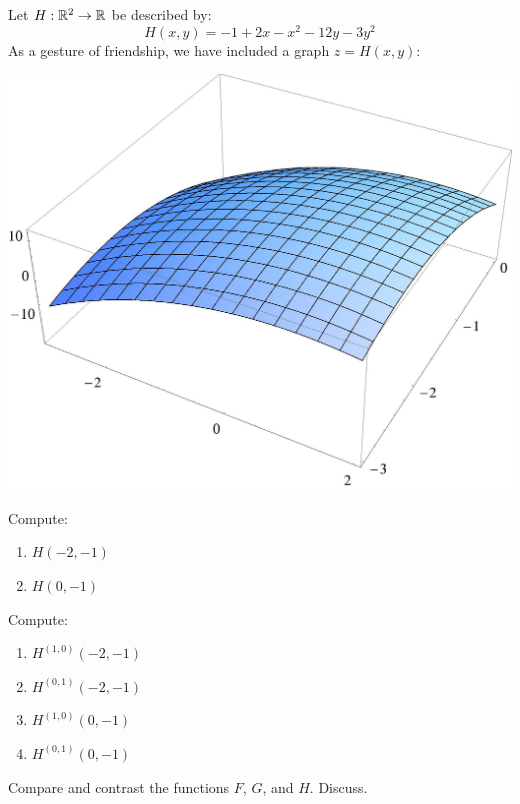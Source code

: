 \documentclass[handout,noauthor,nooutcomes]{ximera}
\begin{document}
Let  $H:\mathbb R^2\to\mathbb R$ be described by:
\[
H(x,y) = -1 + 2 x - x^2 - 12 y - 3 y^2
\]
As a gesture of friendship, we have included a graph $z = H(x,y)$:
\begin{image}
  \includegraphics{surfacePlot.jpg}
\end{image}

\begin{problem}
  Compute:
    \begin{multicols}{2}
    \begin{enumerate}
    \item $H(-2,-1)$
    \item $H(0,-1)$
    \end{enumerate}
  \end{multicols}
\end{problem}

\begin{problem}
  Compute:
    \begin{multicols}{2}
    \begin{enumerate}
    \item $H^{(1,0)}(-2,-1)$
    \item $H^{(0,1)}(-2,-1)$
    \item $H^{(1,0)}(0,-1)$
    \item $H^{(0,1)}(0,-1)$
    \end{enumerate}
  \end{multicols}
\end{problem}

\begin{problem}
  Compare and contrast the functions $F$, $G$, and $H$. Discuss.
\end{problem}
\end{document}
